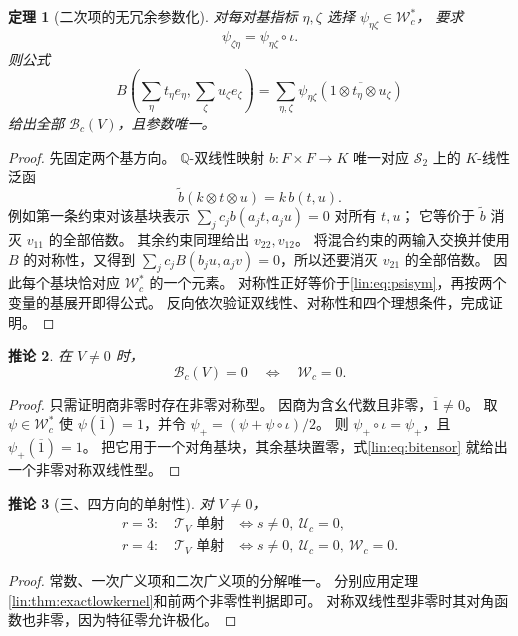 \documentclass[11pt,a4paper,oneside,openany]{book}
\theoremstyle{lecture}
\newtheorem{theorem}{定理}[section]
\newtheorem{corollary}[theorem]{推论}
\newcommand{\Q}{\mathbb Q}
\newcommand{\T}{\mathcal T}
\newcommand{\Uc}{\mathscr U_c}
\newcommand{\Wc}{\mathscr W_c}
\numberwithin{equation}{section}
\begin{document}
\begin{theorem}[二次项的无冗余参数化]\label{lin:thm:bitensor}
对每对基指标 $\eta,\zeta$ 选择 $\psi_{\eta\zeta}\in\Wc^*$，
要求
\begin{equation}\label{lin:eq:psisym}
 \psi_{\zeta\eta}=\psi_{\eta\zeta}\circ\iota.
\end{equation}
则公式
\begin{equation}\label{lin:eq:bitensor}
 B\!\left(\sum_\eta t_\eta e_\eta,\sum_\zeta u_\zeta e_\zeta\right)
 =
 \sum_{\eta,\zeta}
 \psi_{\eta\zeta}\!\left(\overline{1\otimes t_\eta\otimes u_\zeta}\right)
\end{equation}
给出全部 $\mathcal B_c(V)$，且参数唯一。
\end{theorem}
\begin{proof}
先固定两个基方向。
$\Q$-双线性映射 $b:F\times F\to K$ 唯一对应
$\mathscr S_2$ 上的 $K$-线性泛函
\[
 \widetilde b(k\otimes t\otimes u)=k\,b(t,u).
\]
例如第一条约束对该基块表示
$\sum_jc_jb(a_jt,a_ju)=0$ 对所有 $t,u$；
它等价于 $\widetilde b$ 消灭 $v_{11}$ 的全部倍数。
其余约束同理给出 $v_{22},v_{12}$。
将混合约束的两输入交换并使用 $B$ 的对称性，又得到
$\sum_jc_jB(b_ju,a_jv)=0$，所以还要消灭 $v_{21}$ 的全部倍数。
因此每个基块恰对应 $\Wc^*$ 的一个元素。
对称性正好等价于\eqref{lin:eq:psisym}，再按两个变量的基展开即得公式。
反向依次验证双线性、对称性和四个理想条件，完成证明。
\end{proof}

\begin{corollary}\label{lin:cor:binonzero}
在 $V\ne0$ 时，
\[
 \mathcal B_c(V)=0\quad\Longleftrightarrow\quad\Wc=0.
\]
\end{corollary}
\begin{proof}
只需证明商非零时存在非零对称型。
因商为含幺代数且非零，$\overline1\ne0$。
取 $\psi\in\Wc^*$ 使 $\psi(\overline1)=1$，并令
$\psi_+=(\psi+\psi\circ\iota)/2$。
则 $\psi_+\circ\iota=\psi_+$，且 $\psi_+(\overline1)=1$。
把它用于一个对角基块，其余基块置零，式\eqref{lin:eq:bitensor}
就给出一个非零对称双线性型。
\end{proof}

\begin{corollary}[三、四方向的单射性]\label{lin:cor:tensorinject}
对 $V\ne0$，
\[
 \begin{aligned}
 r=3:\quad\T_V\text{ 单射}
 &\Longleftrightarrow s\ne0,\ \Uc=0,\\
 r=4:\quad\T_V\text{ 单射}
 &\Longleftrightarrow s\ne0,\ \Uc=0,\ \Wc=0.
 \end{aligned}
\]
\end{corollary}
\begin{proof}
常数、一次广义项和二次广义项的分解唯一。
分别应用定理\ref{lin:thm:exactlowkernel}和前两个非零性判据即可。
对称双线性型非零时其对角函数也非零，因为特征零允许极化。
\end{proof}
\end{document}
